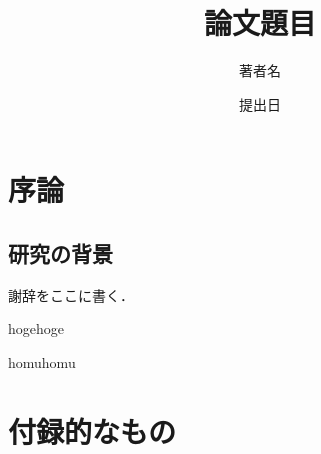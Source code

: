 \documentclass[a4j,12pt,report]{jsbook}
\title{論文題目} %
\author{著者名} %
\date{提出日} %
\begin{document}
\maketitle

\clearpage

\setcounter{page}{1}
\tableofcontents
\newpage

\chapter{序論}
\section{研究の背景}

謝辞をここに書く．

\begin{thebibliography}{99}
  hogehoge
\end{thebibliography}

\begin{relatedworks}{9}
  homuhomu
\end{relatedworks}

\appendix
\chapter{付録的なもの}
\end{document}
